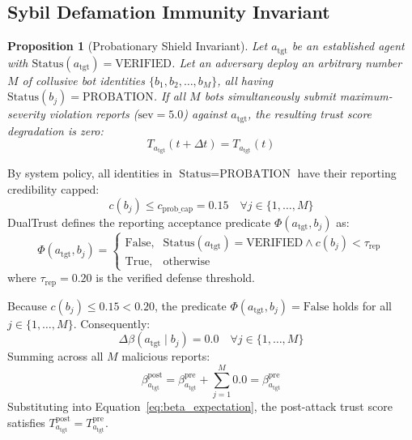 \documentclass[journal]{IEEEtran}
\newtheorem{proposition}{Proposition}
\begin{document}
\subsection{Sybil Defamation Immunity Invariant}
\label{sec:sybil}

\begin{proposition}[Probationary Shield Invariant]
\label{prop:sybil}
\label{thm:sybil}
Let $a_{\text{tgt}}$ be an established agent with $\text{Status}(a_{\text{tgt}}) = \text{VERIFIED}$. Let an adversary deploy an arbitrary number $M$ of collusive bot identities $\{b_1, b_2, \dots, b_M\}$, all having $\text{Status}(b_j) = \text{PROBATION}$. If all $M$ bots simultaneously submit maximum-severity violation reports ($\text{sev} = 5.0$) against $a_{\text{tgt}}$, the resulting trust score degradation is zero:
\begin{equation}
T_{a_{\text{tgt}}}(t + \Delta t) = T_{a_{\text{tgt}}}(t)
\end{equation}
\end{proposition}

\begin{IEEEproof}
By system policy, all identities in $\text{Status} = \text{PROBATION}$ have their reporting credibility capped:
\begin{equation}
c(b_j) \le c_{\text{prob\_cap}} = 0.15 \quad \forall j \in \{1, \dots, M\}
\end{equation}
DualTrust defines the reporting acceptance predicate $\Phi(a_{\text{tgt}}, b_j)$ as:
\begin{equation}
\Phi(a_{\text{tgt}}, b_j) =
\begin{cases}
\text{False}, & \text{Status}(a_{\text{tgt}}) = \text{VERIFIED} \land c(b_j) < \tau_{\text{rep}} \\
\text{True}, & \text{otherwise}
\end{cases}
\end{equation}
where $\tau_{\text{rep}} = 0.20$ is the verified defense threshold.

Because $c(b_j) \le 0.15 < 0.20$, the predicate $\Phi(a_{\text{tgt}}, b_j) = \text{False}$ holds for all $j \in \{1, \dots, M\}$. Consequently:
\begin{equation}
\Delta\beta(a_{\text{tgt}} \mid b_j) = 0.0 \quad \forall j \in \{1, \dots, M\}
\end{equation}
Summing across all $M$ malicious reports:
\begin{equation}
\beta_{a_{\text{tgt}}}^{\text{post}} = \beta_{a_{\text{tgt}}}^{\text{pre}} + \sum_{j=1}^{M} 0.0 = \beta_{a_{\text{tgt}}}^{\text{pre}}
\end{equation}
Substituting into Equation~\eqref{eq:beta_expectation}, the post-attack trust score satisfies $T_{a_{\text{tgt}}}^{\text{post}} = T_{a_{\text{tgt}}}^{\text{pre}}$.
\end{IEEEproof}
\end{document}
